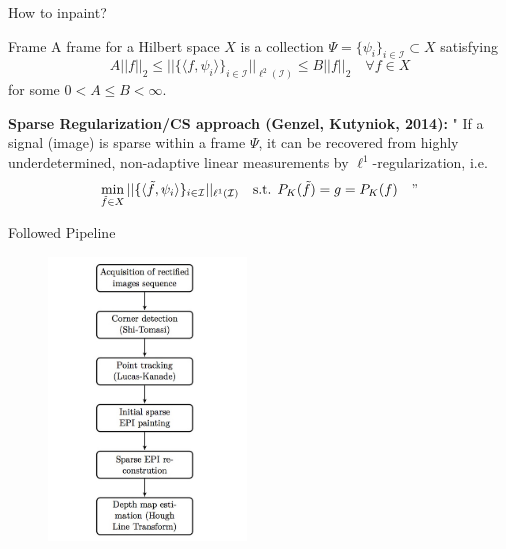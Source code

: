 \begin{frame}{How to inpaint?}
\begin{block}{Frame}
A frame for a Hilbert space $X$ is a collection $\Psi=\{\psi_i\}_{i\in\mathcal{I}}\subset X$ satisfying
$$
A ||f||_2\leq ||\{\langle f,\psi_i\rangle\}_{i\in\mathcal{I}}||_{\ell^2(\mathcal{I})}\leq B||f||_2  \quad \forall f\in X
$$
for some $0<A\leq B<\infty$.
\end{block}

\bigskip

\begin{block}{\textbf{Sparse Regularization/CS approach (Genzel, Kutyniok, 2014):}}
 " If a signal (image) is sparse within a frame $\Psi$, it can be recovered from highly underdetermined, non-adaptive linear measurements by $\ell^1$-regularization, i.e.
$$
\min_{\tilde{f}\in X}||\{\langle\tilde{f},\psi_i\rangle\}_{i\in\mathcal{I}}||_{\ell^1(\mathcal{I})} \quad \text{s.t. }P_K(\tilde{f})=g=P_K(f) \quad "
$$

\end{block}

\end{frame}


\begin{frame}{Followed Pipeline}

\begin{figure}[h!]
\includegraphics[width=0.47\textwidth]{./images/pipeline.jpg}
\end{figure}

\end{frame}


